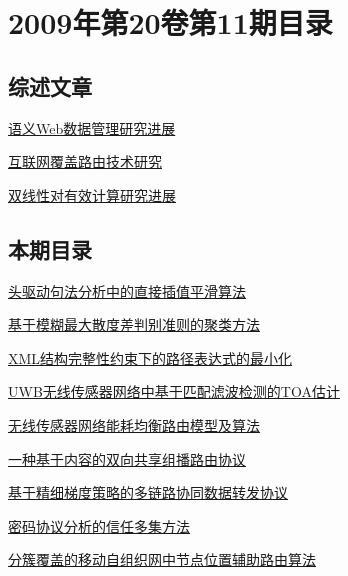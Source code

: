 \documentclass[a4paper]{article}
\begin{document}
\section{\textbf{2009年第20卷第11期目录}}
\subsection{综述文章}
\href{http://www.jos.org.cn/ch/reader/download_pdf.aspx?file_no=3678&year_id=2009&quarter_id=11&falg=1}{语义Web数据管理研究进展}

\href{http://www.jos.org.cn/ch/reader/download_pdf.aspx?file_no=3603&year_id=2009&quarter_id=11&falg=1}{互联网覆盖路由技术研究}

\href{http://www.jos.org.cn/ch/reader/download_pdf.aspx?file_no=3651&year_id=2009&quarter_id=11&falg=1}{双线性对有效计算研究进展}

\subsection{本期目录}
\href{http://www.jos.org.cn/ch/reader/download_pdf.aspx?file_no=3435&year_id=2009&quarter_id=11&falg=1}{头驱动句法分析中的直接插值平滑算法}

\href{http://www.jos.org.cn/ch/reader/download_pdf.aspx?file_no=3410&year_id=2009&quarter_id=11&falg=1}{基于模糊最大散度差判别准则的聚类方法}

\href{http://www.jos.org.cn/ch/reader/download_pdf.aspx?file_no=3422&year_id=2009&quarter_id=11&falg=1}{XML结构完整性约束下的路径表达式的最小化}

\href{http://www.jos.org.cn/ch/reader/download_pdf.aspx?file_no=3376&year_id=2009&quarter_id=11&falg=1}{UWB无线传感器网络中基于匹配滤波检测的TOA估计}

\href{http://www.jos.org.cn/ch/reader/download_pdf.aspx?file_no=3384&year_id=2009&quarter_id=11&falg=1}{无线传感器网络能耗均衡路由模型及算法}

\href{http://www.jos.org.cn/ch/reader/download_pdf.aspx?file_no=3405&year_id=2009&quarter_id=11&falg=1}{一种基于内容的双向共享组播路由协议}

\href{http://www.jos.org.cn/ch/reader/download_pdf.aspx?file_no=3535&year_id=2009&quarter_id=11&falg=1}{基于精细梯度策略的多链路协同数据转发协议}

\href{http://www.jos.org.cn/ch/reader/download_pdf.aspx?file_no=3392&year_id=2009&quarter_id=11&falg=1}{密码协议分析的信任多集方法}

\href{http://www.jos.org.cn/ch/reader/download_pdf.aspx?file_no=583&year_id=2009&quarter_id=11&falg=1}{分簇覆盖的移动自组织网中节点位置辅助路由算法}
\end{document}

